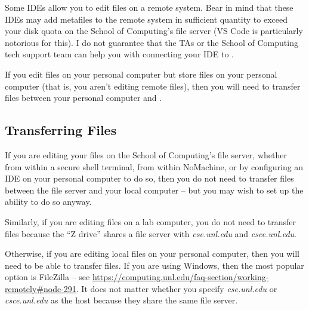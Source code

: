 Some IDEs allow you to edit files on a remote system. Bear in mind that these
IDEs may add metafiles to the remote system in sufficient quantity to exceed
your disk quota on the School of Computing's file server (VS Code is
particularly notorious for this). I do not guarantee that the TAs or the School
of Computing tech support team can help you with connecting your IDE to
\runtimeenvironment.

If you edit files on your personal computer but store files on your personal
computer (that is, you aren't editing remote files), then you will need to
transfer files between your personal computer and \runtimeenvironment.

\subsection{Transferring Files}

If you are editing your files on the School of Computing's file server, whether
from within a secure shell terminal, from within NoMachine, or by configuring
an IDE on your personal computer to do so, then you do not need to transfer
files between the file server and your local computer -- but you may wish to
set up the ability to do so anyway.

Similarly, if you are editing files on a lab computer, you do not need to
transfer files because the ``Z drive'' shares a file server with
\textit{cse.unl.edu} and \textit{csce.unl.edu}.

Otherwise, if you are editing local files on your personal computer, then you
will need to be able to transfer files. If you are using Windows, then the most
popular option is FileZilla -- see
\url{https://computing.unl.edu/faq-section/working-remotely#node-291}. It does
not matter whether you specify \textit{cse.unl.edu} or \textit{csce.unl.edu} as
the host because they share the same file server.

